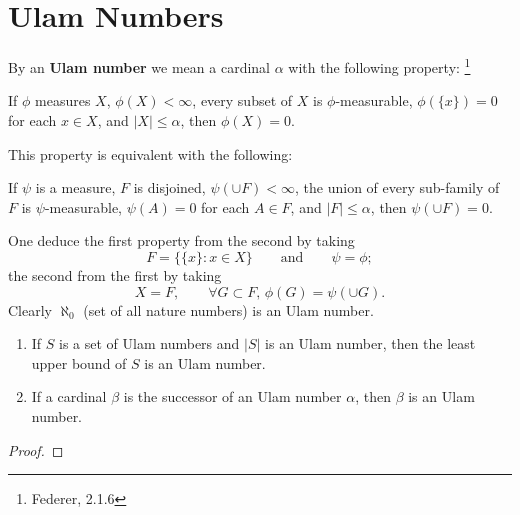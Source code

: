\section{Ulam Numbers}

\begin{definition}
By an \textbf{Ulam number} we mean a cardinal $\alpha$ with the following 
property:
\footnote{Federer, 2.1.6}

If $\phi$ measures $X$, $\phi(X)<\infty$, every subset of $X$ is
$\phi$-measurable, $\phi(\{x\})=0$ for each $x\in X$, and $|X|\le \alpha$, then
$\phi(X)=0$.

This property is equivalent with the following:

If $\psi$ is a measure, $F$ is disjoined, $\psi(\cup F)<\infty$, the union of
every sub-family of $F$ is $\psi$-measurable, $\psi(A)=0$ for each $A\in F$, and
$|F|\le\alpha$, then $\psi(\cup F)=0$.
\end{definition}

One deduce the first property from the second by taking
\[
  F=\{\{x\}: x\in X\} \qquad \text{and} \qquad \psi=\phi;
\]
the second from the first by taking
\[
  X=F, \qquad \forall G\subset F,\, \phi(G)=\psi(\cup G).
\]
Clearly $\aleph_0$ (set of all nature numbers) is an Ulam number.


\begin{proposition}
\begin{enumerate}
  \item If $S$ is a set of Ulam numbers and $|S|$ is an Ulam number, then the
  least upper bound of $S$ is an Ulam number.
  \item If a cardinal $\beta$ is the successor of an Ulam number $\alpha$, then
  $\beta$ is an Ulam number.
\end{enumerate}
\end{proposition}

\begin{proof}
\end{proof}
